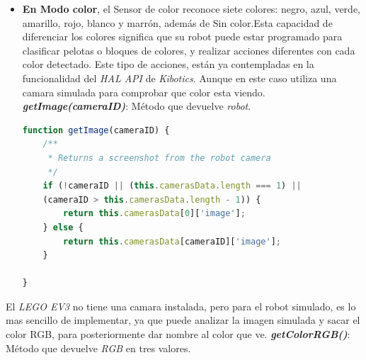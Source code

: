 \begin{itemize}
\item\textbf{En Modo color}, el Sensor de color reconoce siete colores: negro,
azul, verde, amarillo, rojo, blanco y marrón, además de Sin color.Esta capacidad de diferenciar los colores significa que su robot puede estar programado para clasificar pelotas o bloques de colores, y realizar acciones diferentes con cada color detectado.\newline
Este tipo de acciones, están ya contempladas en la funcionalidad del \textit{HAL API} de \textit{Kibotics}. Aunque en este caso utiliza una camara simulada para comprobar que color esta viendo.\newline
\textit{\textbf{getImage(cameraID)}}: Método que devuelve  \textit{robot}. 
    
    \begin{lstlisting}[language=javascript]
   function getImage(cameraID) {
    /**
     * Returns a screenshot from the robot camera
     */
    if (!cameraID || (this.camerasData.length === 1) || 
    (cameraID > this.camerasData.length - 1)) {
        return this.camerasData[0]['image'];
    } else {
        return this.camerasData[cameraID]['image'];
    }

}
    \end{lstlisting}
\end{itemize}

El \textit{LEGO EV3} no tiene una camara instalada, pero para el robot simulado, es lo mas sencillo de implementar, ya que puede analizar la imagen simulada y sacar el color RGB, para posteriormente dar nombre al color que ve.\newline
\textit{\textbf{getColorRGB()}}: Método que devuelve  \textit{RGB} en tres valores. 
    
